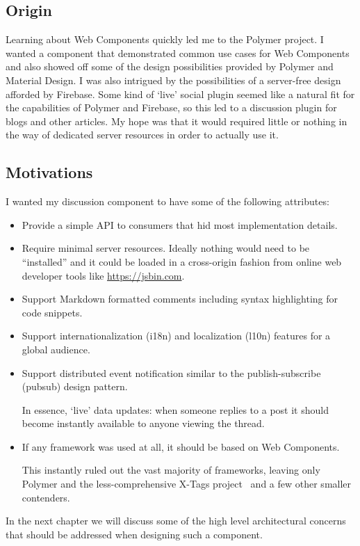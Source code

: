 \subsection{Origin}
Learning about Web Components quickly led me to the Polymer project.
I wanted a component that demonstrated common use cases for Web Components and also showed off some of the design possibilities provided by Polymer and Material Design.
I was also intrigued by the possibilities of a server-free design afforded by Firebase.
Some kind of `live' social plugin seemed like a natural fit for the capabilities of Polymer and Firebase, so this led to a discussion plugin for blogs and other articles.
My hope was that it would required little or nothing in the way of dedicated server resources in order to actually use it. 

\subsection{Motivations}

I wanted my discussion component to have some of the following attributes:

\begin{itemize}
\item Provide a simple API to consumers that hid most implementation details.

\item Require minimal server resources. Ideally nothing would need to be ``installed'' and it could be loaded in a cross-origin fashion from online web developer tools like \url{https://jsbin.com}.

\item Support Markdown formatted comments including syntax highlighting for code snippets.

\item Support internationalization (i18n) and localization (l10n) features for a global audience.

\item Support distributed event notification similar to the publish-subscribe (pubsub) design pattern. 

In essence, `live' data updates:
when someone replies to a post it should become instantly available to anyone viewing the thread.

\item If any framework was used at all, it should be based on Web Components. 


This instantly ruled out the vast majority of frameworks, 
leaving only Polymer and the less-comprehensive X-Tags project~\cite{x-tagscontributors2015} and a few other smaller contenders.

\end{itemize}

In the next chapter we will discuss some of the high level architectural concerns that should be addressed when designing such a component.
